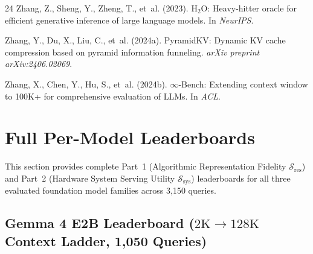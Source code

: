 \documentclass[10pt]{article}
\theoremstyle{definition}
\begin{document}
\begin{thebibliography}{24}
 Zhang, Z., Sheng, Y., Zheng, T., et~al. (2023). $\text{H}_2\text{O}$: Heavy-hitter oracle for efficient generative inference of large language models. In \textit{NeurIPS}.

 Zhang, Y., Du, X., Liu, C., et~al. (2024a). PyramidKV: Dynamic KV cache compression based on pyramid information funneling. \textit{arXiv preprint arXiv:2406.02069}.

 Zhang, X., Chen, Y., Hu, S., et~al. (2024b). $\infty$-Bench: Extending context window to 100K+ for comprehensive evaluation of LLMs. In \textit{ACL}.

\end{thebibliography}
\endgroup


\clearpage
\appendix

\section{Full Per-Model Leaderboards}
\label{sec:app_leaderboards}

This section provides complete Part~1 (Algorithmic Representation Fidelity $\mathcal{S}_{\text{res}}$) and Part~2 (Hardware System Serving Utility $\mathcal{S}_{\text{sys}}$) leaderboards for all three evaluated foundation model families across 3,150 queries.

\subsection{Gemma 4 E2B Leaderboard (\texorpdfstring{$2\text{K} \to 128\text{K}$}{2K to 128K} Context Ladder, 1,050 Queries)}
\end{document}
